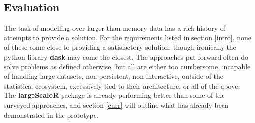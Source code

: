 \subsection{Evaluation}

The task of modelling over larger-than-memory data has a rich history of attempts to provide a solution.
For the requirements listed in section \ref{intro}, none of these come close to providing a satisfactory solution, though ironically the python library \textbf{dask} may come the closest.
The approaches put forward often do solve problems as defined otherwise, but all are either too cumbersome, incapable of handling large datasets, non-persistent, non-interactive, outside of the statistical ecosystem, excessively tied to their architecture, or all of the above.
The \textbf{largeScaleR} package is already performing better than some of the surveyed approaches, and section \ref{curr} will outline what has already been demonstrated in the prototype.

